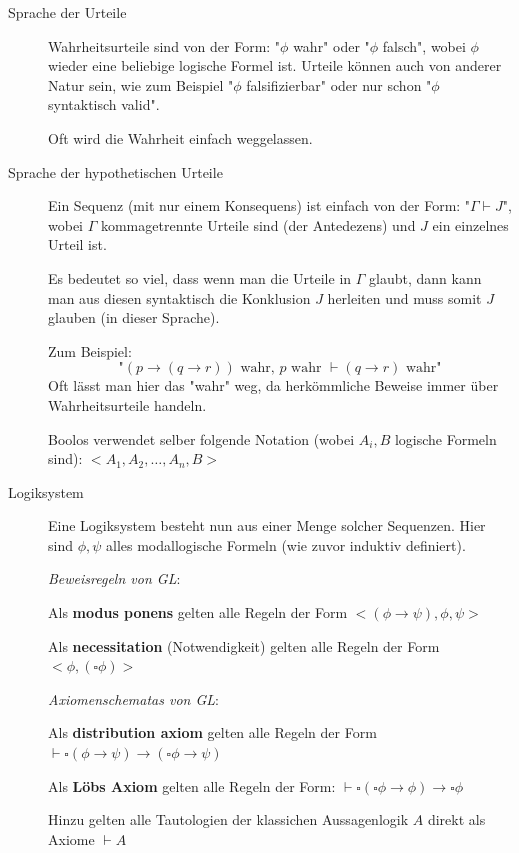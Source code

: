 \documentclass[a4paper,oneside]{article} %
\begin{document}
\begin{description}
	\item[Sprache der Urteile]
	
	Wahrheitsurteile sind von der Form: "$\phi$ wahr" oder "$\phi$ falsch", wobei $\phi$ wieder eine beliebige logische Formel ist.
	Urteile können auch von anderer Natur sein, wie zum Beispiel "$\phi$ falsifizierbar" oder nur schon "$\phi$ syntaktisch valid".
	
	Oft wird die Wahrheit einfach weggelassen.
	
	\item[Sprache der hypothetischen Urteile]
	Ein Sequenz (mit nur einem Konsequens) ist einfach von der Form: 
	"$\Gamma \vdash J$", wobei $\Gamma$ kommagetrennte Urteile sind (der Antedezens) und $J$ ein einzelnes Urteil ist.
	
	Es bedeutet so viel, dass wenn man die Urteile in $\Gamma$ glaubt, dann kann man aus diesen syntaktisch die Konklusion $J$ herleiten und muss somit $J$ glauben (in dieser Sprache).
	
	Zum Beispiel:
	$$\text{"}(p\rightarrow (q \rightarrow r)) \text{ wahr, } p \text{ wahr } \vdash (q \rightarrow r) \text{ wahr"}$$
	Oft lässt man hier das "wahr" weg, da herkömmliche Beweise immer über Wahrheitsurteile handeln. 
	
	Boolos verwendet selber folgende Notation (wobei $A_i,B$ logische Formeln sind):
	$<A_1,A_2,\ldots,A_n,B>$
	
	\item[Logiksystem]
	Eine Logiksystem besteht nun aus einer Menge solcher Sequenzen. Hier sind $\phi, \psi$ alles modallogische Formeln (wie zuvor induktiv definiert).
	
	\textit{Beweisregeln von GL}:
	
	Als \textbf{modus ponens} gelten alle Regeln der Form $<(\phi \rightarrow \psi),\phi,\psi>$
	
	Als \textbf{necessitation} (Notwendigkeit) gelten alle Regeln der Form $<\phi,(\square\phi)>$
	
	\textit{Axiomenschematas von GL}:
	
	Als \textbf{distribution axiom} gelten alle Regeln der Form $\vdash \square(\phi \rightarrow \psi) \rightarrow (\square \phi \rightarrow \psi)$
	
	Als \textbf{Löbs Axiom} gelten alle Regeln der Form: $\vdash \square (\square \phi \rightarrow \phi) \rightarrow \square \phi$
		
	Hinzu gelten alle Tautologien der klassichen Aussagenlogik $A$ direkt als Axiome $\vdash A$
	

\end{description}
\end{document}
